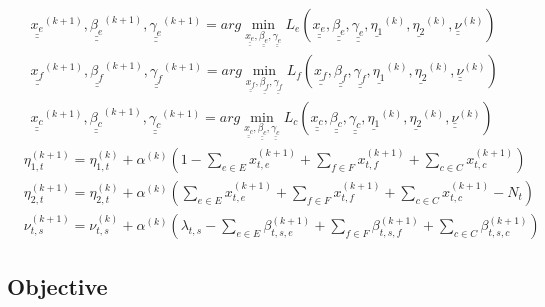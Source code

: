 \documentclass[conference]{IEEEtran}
\begin{document}
    \begin{subequations}
      \begin{align}
        & \underline{\underline {x_e}}^{(k+1)}, \underline{\underline {\beta_e}}^{(k+1)}, \underline{\underline {\gamma_e}}^{(k+1)} = arg \min_{\underline{\underline {x_e}}, \underline{\underline {\beta_e}}, \underline{\underline {\gamma_e}}}L_e(\underline{\underline {x_e}}, \underline{\underline {\beta_e}}, \underline{\underline {\gamma_e}}, \underline {\eta_1}^{(k)}, \underline {\eta_2}^{(k)}, \underline{\underline \nu}^{(k)}) \\
        & \underline{\underline {x_f}}^{(k+1)}, \underline{\underline {\beta_f}}^{(k+1)}, \underline{\underline {\gamma_f}}^{(k+1)} = arg \min_{\underline{\underline {x_f}}, \underline{\underline {\beta_f}}, \underline{\underline {\gamma_f}}}L_f(\underline{\underline {x_f}}, \underline{\underline {\beta_f}}, \underline{\underline {\gamma_f}}, \underline {\eta_1}^{(k)}, \underline {\eta_2}^{(k)}, \underline{\underline \nu}^{(k)}) \\
        & \underline{\underline {x_c}}^{(k+1)}, \underline{\underline {\beta_c}}^{(k+1)}, \underline{\underline {\gamma_c}}^{(k+1)} = arg \min_{\underline{\underline {x_c}}, \underline{\underline {\beta_c}}, \underline{\underline {\gamma_c}}}L_c(\underline{\underline {x_c}}, \underline{\underline {\beta_c}}, \underline{\underline {\gamma_c}}, \underline {\eta_1}^{(k)}, \underline {\eta_2}^{(k)}, \underline{\underline \nu}^{(k)})
      \end{align}
    \end{subequations}
    \begin{subequations}
      \begin{align}
        &\eta_{1,t}^{(k+1)} = \eta_{1,t}^{(k)} + \alpha^{(k)}(1-\sum_{e \in E}x_{t,e}^{(k+1)} + \sum_{f \in F}x_{t,f}^{(k+1)} + \sum_{c \in C}x_{t,c}^{(k+1)}) \\
        &\eta_{2,t}^{(k+1)} = \eta_{2,t}^{(k)} + \alpha^{(k)}(\sum_{e \in E}x_{t,e}^{(k+1)} + \sum_{f \in F}x_{t,f}^{(k+1)} + \sum_{c \in C}x_{t,c}^{(k+1)}-N_t) \\
        &\nu_{t,s}^{(k+1)} = \nu_{t,s}^{(k)} + \alpha^{(k)}(\lambda_{t,s} - \sum_{e \in E}\beta_{t,s,e}^{(k+1)} + \sum_{f \in F}\beta_{t,s,f}^{(k+1)} +\sum_{c \in C}\beta_{t,s,c}^{(k+1)})
      \end{align}
    \end{subequations}
    \subsection{Objective}
\end{document}
